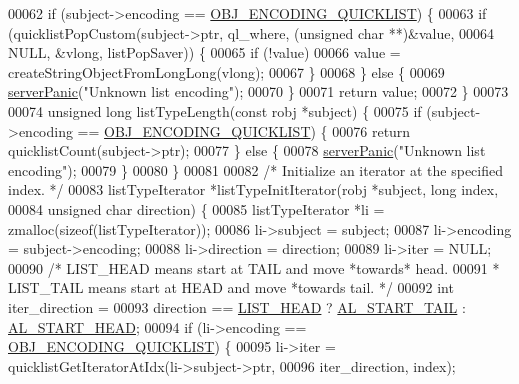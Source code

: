 \begin{DoxyCode}
00062     \textcolor{keywordflow}{if} (subject->encoding == \hyperlink{server_8h_aec792aeed6d4bf83966672e6a23043b8}{OBJ\_ENCODING\_QUICKLIST}) \{
00063         \textcolor{keywordflow}{if} (quicklistPopCustom(subject->ptr, ql\_where, (\textcolor{keywordtype}{unsigned} \textcolor{keywordtype}{char} **)&value,
00064                                NULL, &vlong, listPopSaver)) \{
00065             \textcolor{keywordflow}{if} (!value)
00066                 value = createStringObjectFromLongLong(vlong);
00067         \}
00068     \} \textcolor{keywordflow}{else} \{
00069         \hyperlink{server_8h_a11cc378e7778a830b41240578de3b204}{serverPanic}(\textcolor{stringliteral}{"Unknown list encoding"});
00070     \}
00071     \textcolor{keywordflow}{return} value;
00072 \}
00073 
00074 \textcolor{keywordtype}{unsigned} \textcolor{keywordtype}{long} listTypeLength(\textcolor{keyword}{const} robj *subject) \{
00075     \textcolor{keywordflow}{if} (subject->encoding == \hyperlink{server_8h_aec792aeed6d4bf83966672e6a23043b8}{OBJ\_ENCODING\_QUICKLIST}) \{
00076         \textcolor{keywordflow}{return} quicklistCount(subject->ptr);
00077     \} \textcolor{keywordflow}{else} \{
00078         \hyperlink{server_8h_a11cc378e7778a830b41240578de3b204}{serverPanic}(\textcolor{stringliteral}{"Unknown list encoding"});
00079     \}
00080 \}
00081 
00082 \textcolor{comment}{/* Initialize an iterator at the specified index. */}
00083 listTypeIterator *listTypeInitIterator(robj *subject, \textcolor{keywordtype}{long} index,
00084                                        \textcolor{keywordtype}{unsigned} \textcolor{keywordtype}{char} direction) \{
00085     listTypeIterator *li = zmalloc(\textcolor{keyword}{sizeof}(listTypeIterator));
00086     li->subject = subject;
00087     li->encoding = subject->encoding;
00088     li->direction = direction;
00089     li->iter = NULL;
00090     \textcolor{comment}{/* LIST\_HEAD means start at TAIL and move *towards* head.}
00091 \textcolor{comment}{     * LIST\_TAIL means start at HEAD and move *towards tail. */}
00092     \textcolor{keywordtype}{int} iter\_direction =
00093         direction == \hyperlink{server_8h_a5fc6a15ca26c6208f66ad2768a3108ef}{LIST\_HEAD} ? \hyperlink{adlist_8h_a7d37e2046bb8d302b8ca5de4883a1c7f}{AL\_START\_TAIL} : 
      \hyperlink{adlist_8h_a353f032fdd7e66abe9f194fa7c89560b}{AL\_START\_HEAD};
00094     \textcolor{keywordflow}{if} (li->encoding == \hyperlink{server_8h_aec792aeed6d4bf83966672e6a23043b8}{OBJ\_ENCODING\_QUICKLIST}) \{
00095         li->iter = quicklistGetIteratorAtIdx(li->subject->ptr,
00096                                              iter\_direction, index);

\end{DoxyCode}
